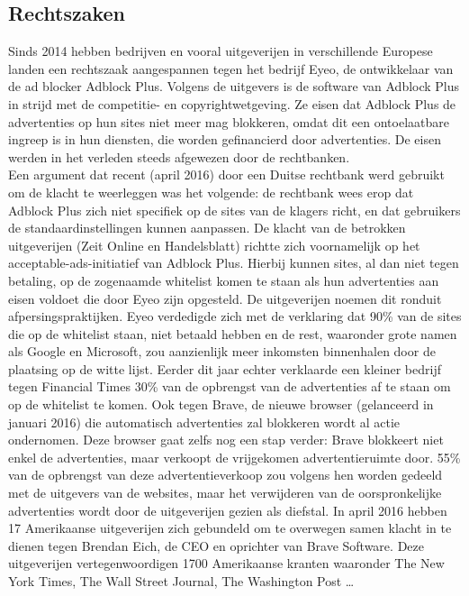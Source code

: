 \documentclass[pdftex,a4paper,12pt,twoside]{report}
\begin{document}
\subsection{Rechtszaken}
\label{sec Rechtszaken}
Sinds 2014 hebben bedrijven en vooral uitgeverijen in verschillende Europese landen een rechtszaak aangespannen tegen het bedrijf Eyeo, de ontwikkelaar van de ad blocker Adblock Plus. Volgens de uitgevers is de software van Adblock Plus in strijd met de competitie- en copyrightwetgeving. Ze eisen dat Adblock Plus de advertenties op hun sites niet meer mag blokkeren, omdat dit een ontoelaatbare ingreep is in hun diensten, die worden gefinancierd door advertenties. 
De eisen werden in het verleden steeds afgewezen door de rechtbanken. 
\\
Een argument dat recent (april 2016) door een Duitse rechtbank werd gebruikt om de klacht te weerleggen was het volgende: de rechtbank wees erop dat Adblock Plus zich niet specifiek op de sites van de klagers richt, en dat gebruikers de standaardinstellingen kunnen aanpassen. De klacht van de betrokken uitgeverijen (Zeit Online en Handelsblatt) richtte zich voornamelijk op het acceptable-ads-initiatief van Adblock Plus. Hierbij kunnen sites, al dan niet tegen betaling, op de zogenaamde whitelist komen te staan als hun advertenties aan eisen voldoet die door Eyeo zijn opgesteld. De uitgeverijen noemen dit ronduit afpersingspraktijken.
Eyeo verdedigde zich met de verklaring dat 90\% van de sites die op de whitelist staan, niet betaald hebben en de rest, waaronder grote namen als Google en Microsoft, zou aanzienlijk meer inkomsten binnenhalen door de plaatsing op de witte lijst. 
Eerder dit jaar echter verklaarde een kleiner bedrijf tegen Financial Times 30\% van de opbrengst van de advertenties af te staan om op de whitelist te komen.
Ook tegen Brave, de nieuwe browser (gelanceerd in januari 2016) die automatisch advertenties zal blokkeren wordt al actie ondernomen. Deze browser gaat zelfs nog een stap verder: Brave blokkeert niet enkel de advertenties, maar verkoopt de vrijgekomen advertentieruimte door. 55\% van de opbrengst van deze advertentieverkoop zou volgens hen worden gedeeld met de uitgevers van de websites, maar het verwijderen van de oorspronkelijke advertenties wordt door de uitgeverijen gezien als diefstal.
In april 2016 hebben 17 Amerikaanse uitgeverijen zich gebundeld om te overwegen samen klacht in te dienen tegen Brendan Eich, de CEO en oprichter van Brave Software. Deze uitgeverijen vertegenwoordigen 1700 Amerikaanse kranten waaronder The New York Times, The Wall Street Journal, The Washington Post …
\end{document}

